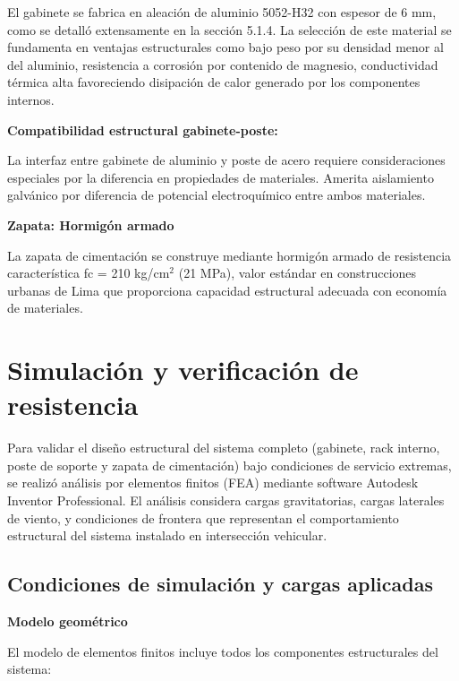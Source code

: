 \documentclass[12pt,a4paper,oneside]{report}
\begin{document}
El gabinete se fabrica en aleación de aluminio 5052-H32 con espesor de 6 mm, como se detalló extensamente en la sección 5.1.4. La selección de este material se fundamenta en ventajas estructurales como bajo peso por su densidad menor al del aluminio, resistencia a corrosión por contenido de magnesio, conductividad térmica alta favoreciendo disipación de calor generado por los componentes internos.

\textbf{Compatibilidad estructural gabinete-poste:}

La interfaz entre gabinete de aluminio y poste de acero requiere consideraciones especiales por la diferencia en propiedades de materiales. Amerita aislamiento galvánico por diferencia de potencial electroquímico entre ambos materiales.

\textbf{Zapata: Hormigón armado}

La zapata de cimentación se construye mediante hormigón armado de resistencia característica f\textquotesingle c = 210 kg/cm\ensuremath{^{2}} (21 MPa), valor estándar en construcciones urbanas de Lima que proporciona capacidad estructural adecuada con economía de materiales.

\section{Simulación y verificación de resistencia}\label{simulaciuxf3n-y-verificaciuxf3n-de-resistencia}

Para validar el diseño estructural del sistema completo (gabinete, rack interno, poste de soporte y zapata de cimentación) bajo condiciones de servicio extremas, se realizó análisis por elementos finitos (FEA) mediante software Autodesk Inventor Professional. El análisis considera cargas gravitatorias, cargas laterales de viento, y condiciones de frontera que representan el comportamiento estructural del sistema instalado en intersección vehicular.

\subsection{Condiciones de simulación y cargas aplicadas}\label{condiciones-de-simulaciuxf3n-y-cargas-aplicadas}

\textbf{Modelo geométrico}

El modelo de elementos finitos incluye todos los componentes estructurales del sistema:
\end{document}
